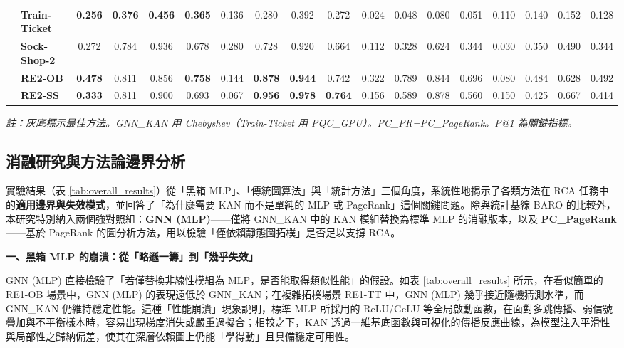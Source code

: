 \documentclass[10pt,a4paper,twocolumn]{article}
\begin{document}
\begin{table}[htbp]
\begin{tabular}{ll|cccc|cccc|cccc|cccc}
& \textbf{Train-Ticket} & \textbf{0.256} & \textbf{0.376} & \textbf{0.456} & \textbf{0.365} & 0.136 & 0.280 & 0.392 & 0.272 & 0.024 & 0.048 & 0.080 & 0.051 & 0.110 & 0.140 & 0.152 & 0.128 \\
& \textbf{Sock-Shop-2} & 0.272 & 0.784 & 0.936 & 0.678 & 0.280 & 0.728 & 0.920 & 0.664 & 0.112 & 0.328 & 0.624 & 0.344 & 0.030 & 0.350 & 0.490 & 0.344 \\
\midrule
{} 
& \textbf{RE2-OB} & \textbf{0.478} & 0.811 & 0.856 & \textbf{0.758} & 0.144 & \textbf{0.878} & \textbf{0.944} & 0.742 & 0.322 & 0.789 & 0.844 & 0.696 & 0.080 & 0.484 & 0.628 & 0.492 \\
& \textbf{RE2-SS} & \textbf{0.333} & 0.811 & 0.900 & 0.693 & 0.067 & \textbf{0.956} & \textbf{0.978} & \textbf{0.764} & 0.156 & 0.589 & 0.878 & 0.560 & 0.150 & 0.425 & 0.667 & 0.414 \\
\bottomrule
\end{tabular}
\vspace{0.2cm}

\footnotesize \textit{註：灰底標示最佳方法。GNN\_KAN 用 Chebyshev（Train-Ticket 用 PQC\_GPU）。PC\_PR=PC\_PageRank。P@1 為關鍵指標。}
\end{table}

\subsection{消融研究與方法論邊界分析}

實驗結果（表 \ref{tab:overall_results}）從「黑箱 MLP」、「傳統圖算法」與「統計方法」三個角度，系統性地揭示了各類方法在 RCA 任務中的\textbf{適用邊界與失效模式}，並回答了「為什麼需要 KAN 而不是單純的 MLP 或 PageRank」這個關鍵問題。除與統計基線 BARO 的比較外，本研究特別納入兩個強對照組：\textbf{GNN (MLP)}——僅將 GNN\_KAN 中的 KAN 模組替換為標準 MLP 的消融版本，以及 \textbf{PC\_PageRank}——基於 PageRank 的圖分析方法，用以檢驗「僅依賴靜態圖拓樸」是否足以支撐 RCA。

\textbf{一、黑箱 MLP 的崩潰：從「略遜一籌」到「幾乎失效」}

GNN (MLP) 直接檢驗了「若僅替換非線性模組為 MLP，是否能取得類似性能」的假設。如表 \ref{tab:overall_results} 所示，在看似簡單的 RE1-OB 場景中，GNN (MLP) 的表現遠低於 GNN\_KAN；在複雜拓樸場景 RE1-TT 中，GNN (MLP) 幾乎接近隨機猜測水準，而 GNN\_KAN 仍維持穩定性能。這種「性能崩潰」現象說明，標準 MLP 所採用的 ReLU/GeLU 等全局啟動函數，在面對多跳傳播、弱信號疊加與不平衡樣本時，容易出現梯度消失或嚴重過擬合；相較之下，KAN 透過一維基底函數與可視化的傳播反應曲線，為模型注入平滑性與局部性之歸納偏差，使其在深層依賴圖上仍能「學得動」且具備穩定可用性。
\end{document}
